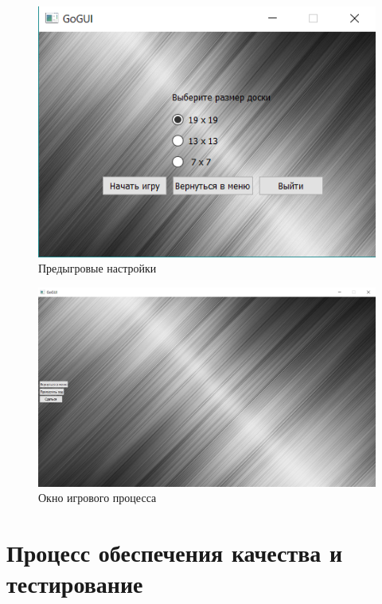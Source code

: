 \begin{figure}[H]
	\begin{center}
		\includegraphics[scale=0.6]{pics/GoGUI/Settings.png}
	    \caption{Предыгровые настройки} 
		\label{pic:CUI_Settings}
	\end{center}
\end{figure}

\begin{figure}[H]
	\begin{center}
		\includegraphics[scale=0.5]{pics/GoGUI/Game.png}
	    \caption{Окно игрового процесса} 
		\label{pic:CUI_Game}
	\end{center}
\end{figure}

\section*{Процесс обеспечения качества и тестирование}

